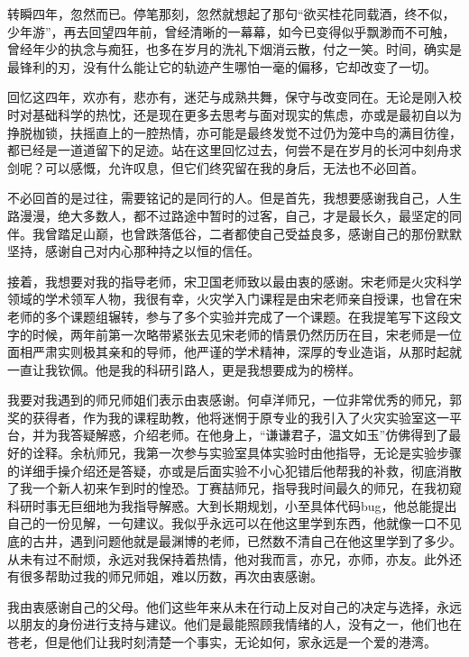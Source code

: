 
\begin{acknowledgements}

    转瞬四年，忽然而已。停笔那刻，忽然就想起了那句“欲买桂花同载酒，终不似，少年游”，再去回望四年前，曾经清晰的一幕幕，如今已变得似乎飘渺而不可触，曾经年少的执念与痴狂，也多在岁月的洗礼下烟消云散，付之一笑。时间，确实是最锋利的刃，没有什么能让它的轨迹产生哪怕一毫的偏移，它却改变了一切。

    回忆这四年，欢亦有，悲亦有，迷茫与成熟共舞，保守与改变同在。无论是刚入校时对基础科学的热忱，还是现在更多去思考与面对现实的焦虑，亦或是最初自以为挣脱枷锁，扶摇直上的一腔热情，亦可能是最终发觉不过仍为笼中鸟的满目彷徨，都已经是一道道留下的足迹。站在这里回忆过去，何尝不是在岁月的长河中刻舟求剑呢？可以感慨，允许叹息，但它们终究留在我的身后，无法也不必回首。

    不必回首的是过往，需要铭记的是同行的人。但是首先，我想要感谢我自己，人生路漫漫，绝大多数人，都不过路途中暂时的过客，自己，才是最长久，最坚定的同伴。我曾踏足山巅，也曾跌落低谷，二者都使自己受益良多，感谢自己的那份默默坚持，感谢自己对内心那种持之以恒的信任。

    接着，我想要对我的指导老师，宋卫国老师致以最由衷的感谢。宋老师是火灾科学领域的学术领军人物，我很有幸，火灾学入门课程是由宋老师亲自授课，也曾在宋老师的多个课题组辗转，参与了多个实验并完成了一个课题。在我提笔写下这段文字的时候，两年前第一次略带紧张去见宋老师的情景仍然历历在目，宋老师是一位面相严肃实则极其亲和的导师，他严谨的学术精神，深厚的专业造诣，从那时起就一直让我钦佩。他是我的科研引路人，更是我想要成为的榜样。

    我要对我遇到的师兄师姐们表示由衷感谢。何卓洋师兄，一位非常优秀的师兄，郭奖的获得者，作为我的课程助教，他将迷惘于原专业的我引入了火灾实验室这一平台，并为我答疑解惑，介绍老师。在他身上，“谦谦君子，温文如玉”仿佛得到了最好的诠释。余杭师兄，我第一次参与实验室具体实验时由他指导，无论是实验步骤的详细手操介绍还是答疑，亦或是后面实验不小心犯错后他帮我的补救，彻底消散了我一个新人初来乍到时的惶恐。丁赛喆师兄，指导我时间最久的师兄，在我初窥科研时事无巨细地为我指导解惑。大到长期规划，小至具体代码bug，他总能提出自己的一份见解，一句建议。我似乎永远可以在他这里学到东西，他就像一口不见底的古井，遇到问题他就是最渊博的老师，已然数不清自己在他这里学到了多少。从未有过不耐烦，永远对我保持着热情，他对我而言，亦兄，亦师，亦友。此外还有很多帮助过我的师兄师姐，难以历数，再次由衷感谢。

    我由衷感谢自己的父母。他们这些年来从未在行动上反对自己的决定与选择，永远以朋友的身份进行支持与建议。他们是最能照顾我情绪的人，没有之一，他们也在苍老，但是他们让我时刻清楚一个事实，无论如何，家永远是一个爱的港湾。


\end{acknowledgements}
